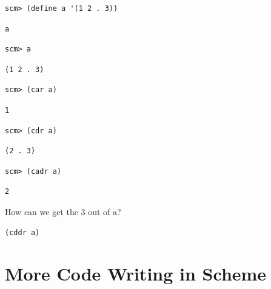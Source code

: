 \documentclass{exam}
\begin{document}
\begin{questions}
\begin{blocksection}
\begin{lstlisting}
scm> (define a '(1 2 . 3))
\end{lstlisting}
\begin{solution}[.25in]
\begin{lstlisting}
a
\end{lstlisting}
\end{solution}

\begin{lstlisting}
scm> a
\end{lstlisting}
\begin{solution}[.25in]
\begin{lstlisting}
(1 2 . 3)
\end{lstlisting}
\end{solution}

\begin{lstlisting}
scm> (car a)
\end{lstlisting}
\begin{solution}[.25in]
\begin{lstlisting}
1
\end{lstlisting}
\end{solution}

\begin{lstlisting}
scm> (cdr a)
\end{lstlisting}
\begin{solution}[.25in]
\begin{lstlisting}
(2 . 3)
\end{lstlisting}
\end{solution}

\begin{lstlisting}
scm> (cadr a)
\end{lstlisting}
\begin{solution}[.25in]
\begin{lstlisting}
2
\end{lstlisting}
\end{solution}

How can we get the 3 out of a?
\begin{solution}[.25in]
\begin{lstlisting}
(cddr a)
\end{lstlisting}
\end{solution}
\end{blocksection}

\section{More Code Writing in Scheme}


\end{questions}
\end{document}
